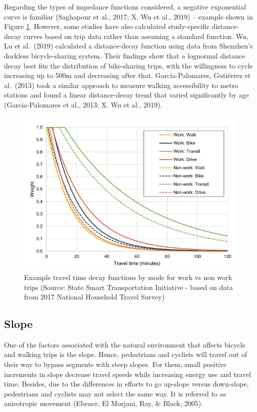 \documentclass[
11pt, %
oneside, %
english, %
singlespacing, %
]{macthesis} %
\begin{document}
Regarding the types of impedance functions considered, a negative exponential curve is familiar (Saghapour et al., 2017; X. Wu et al., 2019) -- example shown in Figure \ref{fig:initiative}. However, some studies have also calculated study-specific distance-decay curves based on trip data rather than assuming a standard function. Wu, Lu et al.~(2019) calculated a distance-decay function using data from Shenzhen's dockless bicycle-sharing system. Their findings show that a lognormal distance decay best fits the distribution of bike-sharing trips, with the willingness to cycle increasing up to 500m and decreasing after that. García-Palomares, Gutiérrez et al.~(2013) took a similar approach to measure walking accessibility to metro stations and found a linear distance-decay trend that varied significantly by age (Garcia-Palomares et al., 2013; X. Wu et al., 2019).

\begin{figure}

{\centering \includegraphics[width=0.9\linewidth]{figure/ch02-Fig-02} 

}

\caption{Example travel time decay functions by mode for work vs non work trips (Source: State Smart Transportation Initiative - based on data from 2017 National Household Travel Survey)}\label{fig:initiative}
\end{figure}

\hypertarget{slope}{%
\subsection{Slope}\label{slope}}

One of the factors associated with the natural environment that affects bicycle and walking trips is the slope. Hence, pedestrians and cyclists will travel out of their way to bypass segments with steep slopes. For them, small positive increments in slope decrease travel speeds while increasing energy use and travel time. Besides, due to the differences in efforts to go up-slope versus down-slope, pedestrians and cyclists may not select the same way. It is referred to as anisotropic movement (Ebener, El Morjani, Ray, \& Black, 2005).
\end{document}
